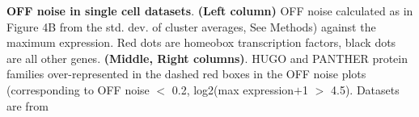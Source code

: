 \textbf{OFF noise in single cell datasets}. \textbf{(Left column)} OFF noise calculated as in Figure 4B from the std. dev. of cluster averages, See Methods) against the maximum expression. Red dots are homeobox transcription factors, black dots are all other genes. \textbf{(Middle, Right columns)}. HUGO and PANTHER protein families over-represented in the dashed red boxes in the OFF noise plots (corresponding to OFF noise $<$ 0.2, log2(max expression$+$1 $>$ 4.5). Datasets are from \citep{Zeisel_2015,Tasic_2016,Zeisel_2018,Saunders_2018}
